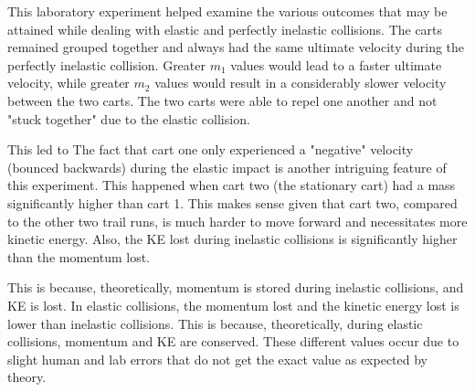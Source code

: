 

{This laboratory experiment helped examine the various outcomes that may be attained while dealing with elastic and perfectly inelastic collisions. The carts remained grouped together and always had the same ultimate velocity during the perfectly inelastic collision. Greater $m_{1}$ values would lead to a faster ultimate velocity, while greater $m_{2}$ values would result in a considerably slower velocity between the two carts. The two carts were able to repel one another and not "stuck together" due to the elastic collision.}

{This led to The fact that cart one only experienced a "negative" velocity (bounced backwards) during the elastic impact is another intriguing feature of this experiment. This happened when cart two (the stationary cart) had a mass significantly higher than cart 1. This makes sense given that cart two, compared to the other two trail runs, is much harder to move forward and necessitates more kinetic energy. Also, the KE lost during inelastic collisions is significantly higher than the momentum lost.}

{This is because, theoretically, momentum is stored during inelastic collisions, and KE is lost. In elastic collisions, the momentum lost and the kinetic energy lost is lower than inelastic collisions. This is because, theoretically, during elastic collisions, momentum and KE are conserved. These different values occur due to slight human and lab errors that do not get the exact value as expected by theory.}

{}

{}

{}

{}

{}

{}

{}


